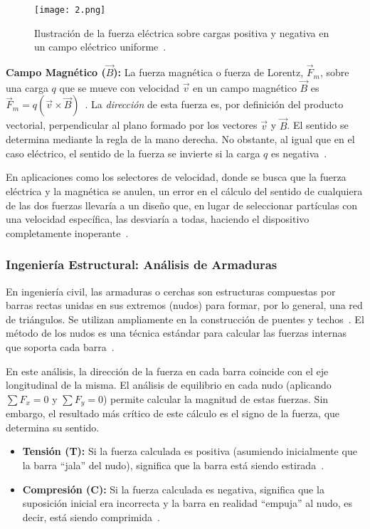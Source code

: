 \documentclass[12pt,a4paper]{article}
\begin{document}
\begin{figure}[H]
    \centering
    \texttt{[image: 2.png]}
    \caption{Ilustración de la fuerza eléctrica sobre cargas positiva y negativa en un campo eléctrico uniforme~\cite{bariloche_web}.}
    \label{fig:fuerza_electrica}    
\end{figure}

\textbf{Campo Magnético ($\vec{B}$):} La fuerza magnética o fuerza de Lorentz, $\vec{F}_m$, sobre una carga $q$ que se mueve con velocidad $\vec{v}$ en un campo magnético $\vec{B}$ es $\vec{F}_m = q(\vec{v} \times \vec{B})$~\cite{bariloche_web}. La \emph{dirección} de esta fuerza es, por definición del producto vectorial, perpendicular al plano formado por los vectores $\vec{v}$ y $\vec{B}$. El sentido se determina mediante la regla de la mano derecha. No obstante, al igual que en el caso eléctrico, el sentido de la fuerza se invierte si la carga $q$ es negativa~\cite{bariloche_web}.

En aplicaciones como los selectores de velocidad, donde se busca que la fuerza eléctrica y la magnética se anulen, un error en el cálculo del sentido de cualquiera de las dos fuerzas llevaría a un diseño que, en lugar de seleccionar partículas con una velocidad específica, las desviaría a todas, haciendo el dispositivo completamente inoperante~\cite{bariloche_web}.

\subsubsection{Ingeniería Estructural: Análisis de Armaduras} \label{subsubsec:estructural}

En ingeniería civil, las armaduras o cerchas son estructuras compuestas por barras rectas unidas en sus extremos (nudos) para formar, por lo general, una red de triángulos. Se utilizan ampliamente en la construcción de puentes y techos~\cite{benguria_armaduras}. El método de los nudos es una técnica estándar para calcular las fuerzas internas que soporta cada barra~\cite{benguria_armaduras}.

En este análisis, la dirección de la fuerza en cada barra coincide con el eje longitudinal de la misma. El análisis de equilibrio en cada nudo (aplicando $\sum F_x = 0$ y $\sum F_y = 0$) permite calcular la magnitud de estas fuerzas. Sin embargo, el resultado más crítico de este cálculo es el signo de la fuerza, que determina su sentido.

\begin{itemize}
\item \textbf{Tensión (T):} Si la fuerza calculada es positiva (asumiendo inicialmente que la barra ``jala'' del nudo), significa que la barra está siendo estirada~\cite{benguria_armaduras}.

\item \textbf{Compresión (C):} Si la fuerza calculada es negativa, significa que la suposición inicial era incorrecta y la barra en realidad ``empuja'' al nudo, es decir, está siendo comprimida~\cite{benguria_armaduras}.
\end{itemize}
\end{document}
